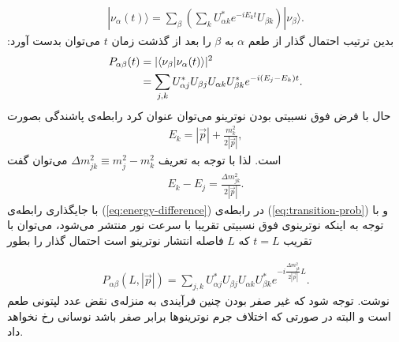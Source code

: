 \documentclass[a4paper]{book}
\begin{document}
\par
\vspace{-0.5cm}
{\footnotesize\begin{align}
	|\nu_{\alpha}(t)\rangle=\sum_{\beta}\left(\sum_{k}U^*_{\alpha k} e^{-iE_kt}U_{\beta k}\right) |\nu_{\beta}\rangle.
\end{align}}
بدین ترتیب احتمال گذار از طعم {\footnotesize$\alpha$} به {\footnotesize$\beta$} را بعد از گذشت زمان {\footnotesize$t$} می‌توان بدست آورد:
{\footnotesize\begin{align}
	P_{\alpha \beta}(t) &=|\langle\nu_{\beta}|\nu_{\alpha}(t)\rangle|^2 \notag\\
	&= \sum_{j ,k} U^*_{\alpha j} U_{\beta j} U_{\alpha k} U^*_{\beta k} e^{-i(E_j - E_k)t}.
	\label{eq:transition-prob}
\end{align}}
حال با فرض فوق نسبیتی بودن نوترینو می‌توان عنوان کرد رابطه‌ی پاشندگی بصورت
{\footnotesize\begin{align}
	E_k=|\vec{p}|+\frac{m_k^2}{2|\vec{p}|},
\end{align}}
است. لذا با توجه به تعریف {\footnotesize$\Delta m_{jk}^2 \equiv m_j^2 - m_k^2$} می‌توان گفت
{\footnotesize\begin{align}
	E_k-E_j=\frac{\Delta m_{jk}^2}{2|\vec{p}|}.
	\label{eq:energy-difference}
\end{align}}
با جایگذاری رابطه‌ی (\ref{eq:energy-difference}) در رابطه‌ی (\ref{eq:transition-prob}) و با توجه به اینکه نوترینوی فوق نسبیتی تقریبا با سرعت نور منتشر می‌شود، می‌توان با تقریب {\footnotesize$t=L$} که {\footnotesize$L$} فاصله انتشار نوترینو است احتمال گذار را بطور
\par
\vspace{-0.5cm}
{\footnotesize\begin{align}
	P_{\alpha \beta}(L,|\vec{p}|) = \sum_{j ,k} U^*_{\alpha j} U_{\beta j} U_{\alpha k} U^*_{\beta k} e^{-i\frac{\Delta m_{jk}^2}{2|\vec{p}|}L}.
\end{align}}
نوشت. توجه شود که غیر صفر بودن چنین فرآیندی به منزله‌ی نقض عدد لپتونی طعم است و البته در صورتی که اختلاف جرم نوترینوها برابر صفر باشد نوسانی رخ نخواهد داد.
\end{document}
